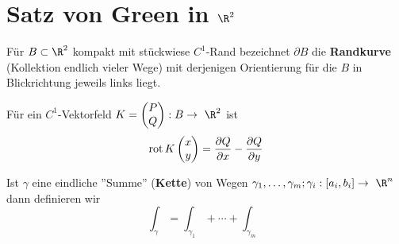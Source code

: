 \section{Satz von Green in \texorpdfstring{$\R^2$}{R2}}
\begin{def*}[note = Randkurve , index = Rand kurve , indexformat = {1.2 1!~-2}]
	Für $B \subset \R^2$ kompakt mit stückwiese $C^1$-Rand bezeichnet $\partial B$ die \textbf{Randkurve} (Kollektion endlich vieler Wege) mit derjenigen Orientierung für die $B$ in Blickrichtung jeweils links liegt.
\end{def*}
\begin{def*}[ note = Rotation , index = Rotation ]
	Für ein $C^1$-Vektorfeld $K = \begin{pmatrix} P \\ Q \end{pmatrix} : B \rightarrow \R^2$ ist
	\[ \operatorname{rot} K\begin{pmatrix} x \\ y \end{pmatrix} = \frac{\partial Q}{\partial x} - \frac{\partial Q}{\partial y} \]
\end{def*}
Ist $\gamma$ eine eindliche ''Summe'' (\textbf{Kette}) von Wegen $\gamma_1 , \dotsc , \gamma_m ; \gamma_i : [ a_i , b_i ] \rightarrow \R^n$ dann definieren wir
\[ \int_{\gamma} = \int_{\gamma_1} + \dotsb + \int_{\gamma_m} \]
